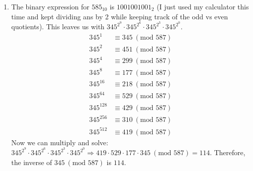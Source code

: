 {\begin{enumerate}
\begin{enumerate}[label=(\roman*)]
                  \item The binary expression for \(585_{10}\) is \(1001001001_2\) (I just used my calculator this time and kept dividing ans by 2 while keeping track of the odd vs even quotients). This leaves us with \(345^{2^9} \cdot 345^{2^6} \cdot 345^{2^3} \cdot 345^{2^0}\).
                        \begin{align*}
                            345^1     & \equiv 345 \ (\text{mod } 587) \\
                            345^2     & \equiv 451 \ (\text{mod } 587) \\
                            345^4     & \equiv 299 \ (\text{mod } 587) \\
                            345^8     & \equiv 177 \ (\text{mod } 587) \\
                            345^{16}  & \equiv 218 \ (\text{mod } 587) \\
                            345^{64}  & \equiv 529 \ (\text{mod } 587) \\
                            345^{128} & \equiv 429 \ (\text{mod } 587) \\
                            345^{256} & \equiv 310 \ (\text{mod } 587) \\
                            345^{512} & \equiv 419 \ (\text{mod } 587)
                        \end{align*}
                        Now we can multiply and solve: \(345^{2^9} \cdot 345^{2^6} \cdot 345^{2^3} \cdot 345^{2^0} \Rightarrow 419 \cdot 529 \cdot 177 \cdot 345 \ (\text{mod } 587) = 114\). Therefore, the inverse of \(345 \ (\text{mod } 587)\) is \(114\).
              \end{enumerate}
    \end{enumerate}
}


